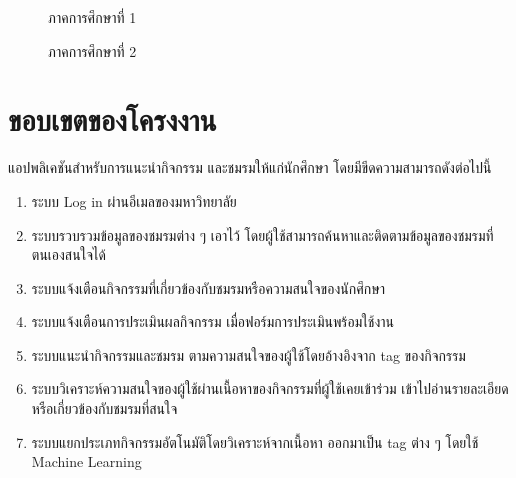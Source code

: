 \documentclass[14pt,oneside,openright,a4paper]{cpe-thai-project}
\begin{document}
  \begin{figure}[!h]\centering
    \setlength{\fboxrule}{0.5mm} %
    \setlength{\fboxsep}{0.5cm}
    \caption{ภาคการศึกษาที่ 1}\label{fig:Gantt_Chart_1st_Sem}
  \end{figure}

  \begin{figure}[!h]\centering
    \setlength{\fboxrule}{0.5mm} %
    \setlength{\fboxsep}{0.5cm}
    \caption{ภาคการศึกษาที่ 2}\label{fig:Gantt_Chart_2nd_Sem}
  \end{figure}

\newpage

\section{ขอบเขตของโครงงาน}
แอปพลิเคชันสำหรับการแนะนำกิจกรรม และชมรมให้แก่นักศึกษา โดยมีขีดความสามารถดังต่อไปนี้

  \begin{enumerate}
    \item ระบบ Log in ผ่านอีเมลของมหาวิทยาลัย
    \item ระบบรวบรวมข้อมูลของชมรมต่าง ๆ เอาไว้ โดยผู้ใช้สามารถค้นหาและติดตามข้อมูลของชมรมที่ตนเองสนใจได้
    \item ระบบแจ้งเตือนกิจกรรมที่เกี่ยวข้องกับชมรมหรือความสนใจของนักศึกษา
    \item ระบบแจ้งเตือนการประเมินผลกิจกรรม เมื่อฟอร์มการประเมินพร้อมใช้งาน
    \item ระบบแนะนำกิจกรรมและชมรม ตามความสนใจของผู้ใช้โดยอ้างอิงจาก tag ของกิจกรรม
    \item ระบบวิเคราะห์ความสนใจของผู้ใช้ผ่านเนื้อหาของกิจกรรมที่ผู้ใช้เคยเข้าร่วม เข้าไปอ่านรายละเอียด หรือเกี่ยวข้องกับชมรมที่สนใจ
    \item ระบบแยกประเภทกิจกรรมอัตโนมัติโดยวิเคราะห์จากเนื้อหา ออกมาเป็น tag ต่าง ๆ โดยใช้ Machine Learning
  \end{enumerate}
\end{document}
